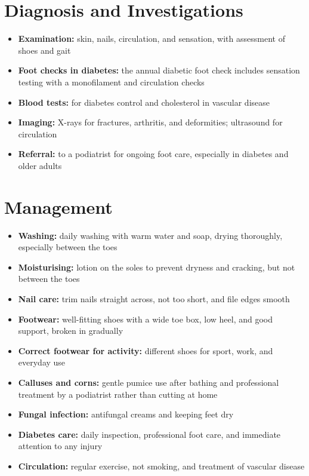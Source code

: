 \section*{Diagnosis and Investigations}
\begin{itemize}
    \item \textbf{Examination:} skin, nails, circulation, and sensation, with assessment of shoes and gait
    \item \textbf{Foot checks in diabetes:} the annual diabetic foot check includes sensation testing with a monofilament and circulation checks
    \item \textbf{Blood tests:} for diabetes control and cholesterol in vascular disease
    \item \textbf{Imaging:} X-rays for fractures, arthritis, and deformities; ultrasound for circulation
    \item \textbf{Referral:} to a podiatrist for ongoing foot care, especially in diabetes and older adults
\end{itemize}

\section*{Management}
\begin{itemize}
    \item \textbf{Washing:} daily washing with warm water and soap, drying thoroughly, especially between the toes
    \item \textbf{Moisturising:} lotion on the soles to prevent dryness and cracking, but not between the toes
    \item \textbf{Nail care:} trim nails straight across, not too short, and file edges smooth
    \item \textbf{Footwear:} well-fitting shoes with a wide toe box, low heel, and good support, broken in gradually
    \item \textbf{Correct footwear for activity:} different shoes for sport, work, and everyday use
    \item \textbf{Calluses and corns:} gentle pumice use after bathing and professional treatment by a podiatrist rather than cutting at home
    \item \textbf{Fungal infection:} antifungal creams and keeping feet dry
    \item \textbf{Diabetes care:} daily inspection, professional foot care, and immediate attention to any injury
    \item \textbf{Circulation:} regular exercise, not smoking, and treatment of vascular disease
\end{itemize}

